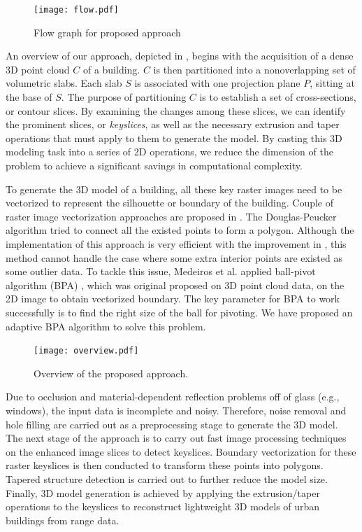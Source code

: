 \begin{figure}[htb]
  \centering
  \texttt{[image: flow.pdf]}
      \caption{Flow graph for proposed approach}
      \label{fig:flow}
\end{figure}

An overview of our approach, depicted in , begins with the
acquisition of a dense 3D point cloud $C$ of a building.
$C$ is then partitioned into a nonoverlapping set of volumetric slabs.
Each slab $S$ is associated with one projection plane $P$,
sitting at the base of $S$.
The purpose of partitioning $C$ is to establish a set of cross-sections,
or contour slices.
By examining the changes among these slices, we can identify the prominent
slices, or {\it keyslices}, as well as the necessary extrusion and
taper operations that must apply to them to generate the model.
By casting this 3D modeling task into a series of 2D operations, we
reduce the dimension of the problem to achieve a significant savings in
computational complexity.

To generate the 3D model of a building, all these key raster images need 
to be vectorized to represent the silhouette or boundary of the building. 
Couple of raster image vectorization approaches are
proposed in \cite{DP_AAKMT, DP_DP, DP_WM}. The Douglas-Peucker
algorithm tried to connect all the existed points to form a polygon. 
Although the implementation of
this approach is very efficient with the improvement in \cite{DP_HS},  this method cannot
handle the case where some extra interior points are existed as some outlier data.
To tackle this issue, Medeiros et al. \cite{BPA_MVL} applied ball-pivot algorithm (BPA)
\cite{BPA_BMRS}, which was original proposed on 3D point cloud data, on the 2D image to obtain
vectorized boundary. The key parameter for BPA to work successfully is to find the right size of
the ball for pivoting. We have proposed an adaptive BPA algorithm to solve this problem.

\begin{figure}[htbp]
\begin{center}
\texttt{[image: overview.pdf]}
\end{center}
\caption{Overview of the proposed approach.}
\label{fig:ov}
\end{figure}

Due to occlusion and material-dependent reflection problems off of glass
(e.g., windows), the input data is incomplete and noisy.
Therefore, noise removal and hole filling are carried out as a
preprocessing stage to generate the 3D model.
The next stage of the approach is to carry out fast image processing
techniques on the enhanced image slices to detect keyslices.
Boundary vectorization for these raster keyslices is then conducted to
transform these points into polygons.
Tapered structure detection is carried out to further reduce the model size.
Finally, 3D model generation is achieved by applying the extrusion/taper
operations to the keyslices to reconstruct lightweight 3D models of urban
buildings from range data.

